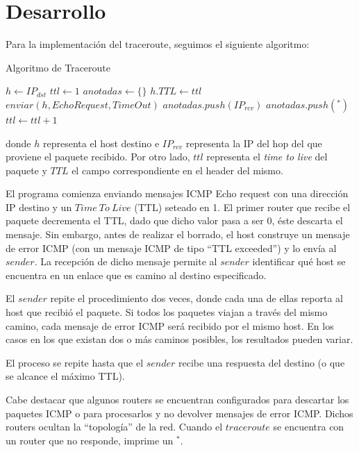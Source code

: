 \documentclass[10pt, a4paper]{article}
\begin{document}
\section{Desarrollo}
Para la implementación del traceroute, seguimos el siguiente algoritmo:

\begin{algorithm}
\caption{Algoritmo de Traceroute}
\begin{algorithmic}

\State $h\gets IP_{dst}$
\State $ttl\gets 1$
\State $anotadas \gets \{\}$
\Repeat
	\State $h.TTL \gets ttl$
	\State $enviar(h, EchoRequest, TimeOut)$
    	\State $anotadas.push(IP_{rcv})$
    \Else
    	\State $anotadas.push(^*)$
    \EndIf
    \State $ttl\gets ttl+1$
\EndProcedure
\end{algorithmic}
\end{algorithm}

donde $h$ representa el host destino e $IP_{rcv}$ representa la IP del hop del que proviene el paquete recibido. Por otro lado, $ttl$ representa el \textit{time to live} del paquete y $TTL$ el campo correspondiente en el header del mismo.

El programa comienza enviando mensajes ICMP Echo request con una dirección IP destino y un $Time\ To\ Live$ (TTL) seteado en 1. El primer router que recibe el paquete decrementa el TTL, dado que dicho valor pasa a ser 0, éste descarta el mensaje. Sin embargo, antes de realizar el borrado, el host construye un mensaje de error ICMP (con un mensaje ICMP de tipo ``TTL exceeded'') y lo envía al $sender$. La recepción de dicho mensaje permite al $sender$ identificar qué host se encuentra en un enlace que es camino al destino especificado.

El $sender$ repite el procedimiento dos veces, donde cada una de ellas reporta al host que recibió el paquete. Si todos los paquetes viajan a través del mismo camino, cada mensaje de error ICMP será recibido por el mismo host. En los casos en los que existan dos o más caminos posibles, los resultados pueden variar.

El proceso se repite hasta que el $sender$ recibe una respuesta del destino (o que se alcance el máximo TTL).

Cabe destacar que algunos routers se encuentran configurados para descartar los paquetes ICMP o para procesarlos y no devolver mensajes de error ICMP. Dichos routers ocultan la ``topología'' de la red. Cuando el $traceroute$ se encuentra con un router que no responde, imprime un $^*$.
\end{document}
